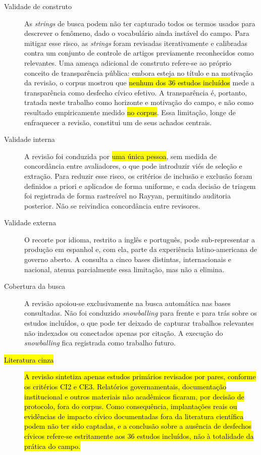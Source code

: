 \documentclass[brazilian]{sbc2025}
\newif\ifhl \hltrue
\newcommand{\rev}[1]{\ifhl\sethlcolor{yellow}\hl{#1}\else#1\fi}
\begin{document}
\begin{description}
\item[Validade de construto] As \emph{strings} de busca podem não ter capturado todos os termos usados para descrever o fenômeno, dado o vocabulário ainda instável do campo. Para mitigar esse risco, as \emph{strings} foram revisadas iterativamente e calibradas contra um conjunto de controle de artigos previamente reconhecidos como relevantes. Uma ameaça adicional de construto refere-se ao próprio conceito de transparência pública: embora esteja no título e na motivação da revisão, o corpus mostrou que \rev{nenhum dos 36 estudos incluídos} mede a transparência como desfecho cívico efetivo. A transparência é, portanto, tratada neste trabalho como horizonte e motivação do campo, e não como resultado empiricamente medido \rev{no corpus}. Essa limitação, longe de enfraquecer a revisão, constitui um de seus achados centrais.

\item[Validade interna] A revisão foi conduzida por \rev{uma única pessoa}, sem medida de concordância entre avaliadores, o que pode introduzir viés de seleção e extração. Para reduzir esse risco, os critérios de inclusão e exclusão foram definidos a priori e aplicados de forma uniforme, e cada decisão de triagem foi registrada de forma rastreável no Rayyan, permitindo auditoria posterior. Não se reivindica concordância entre revisores.

\item[Validade externa] O recorte por idioma, restrito a inglês e português, pode sub-representar a produção em espanhol e, com ela, parte da experiência latino-americana de governo aberto. A consulta a cinco bases distintas, internacionais e nacional, atenua parcialmente essa limitação, mas não a elimina.

\item[Cobertura da busca] A revisão apoiou-se exclusivamente na busca automática nas bases consultadas. Não foi conduzido \emph{snowballing} para frente e para trás \citep{wohlin2014} sobre os estudos incluídos, o que pode ter deixado de capturar trabalhos relevantes não indexados ou conectados apenas por citação. A execução do \emph{snowballing} fica registrada como trabalho futuro.

\item[\rev{Literatura cinza}] \rev{A revisão sintetiza apenas estudos primários revisados por pares, conforme os critérios CI2 e CE3. Relatórios governamentais, documentação institucional e outros materiais não acadêmicos ficaram, por decisão de protocolo, fora do corpus. Como consequência, implantações reais ou evidências de impacto cívico documentadas fora da literatura científica podem não ter sido captadas, e a conclusão sobre a ausência de desfechos cívicos refere-se estritamente aos 36 estudos incluídos, não à totalidade da prática do campo.}


\end{description}
\end{document}
